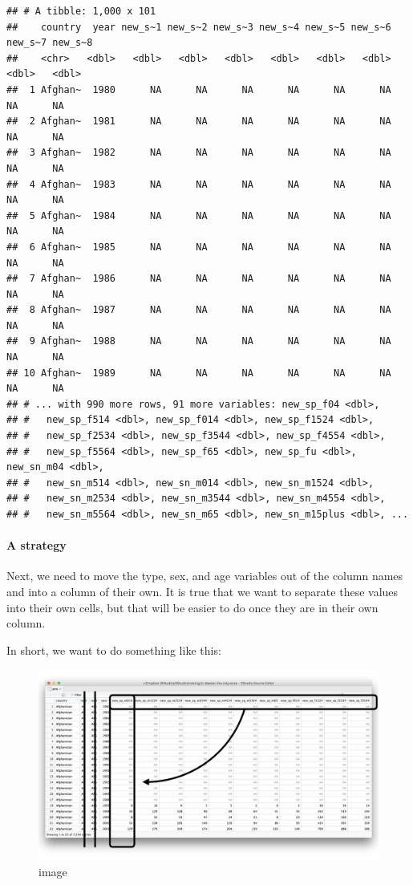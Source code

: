 \documentclass[
]{article}
\begin{document}
\begin{verbatim}
## # A tibble: 1,000 x 101
##    country  year new_s~1 new_s~2 new_s~3 new_s~4 new_s~5 new_s~6 new_s~7 new_s~8
##    <chr>   <dbl>   <dbl>   <dbl>   <dbl>   <dbl>   <dbl>   <dbl>   <dbl>   <dbl>
##  1 Afghan~  1980      NA      NA      NA      NA      NA      NA      NA      NA
##  2 Afghan~  1981      NA      NA      NA      NA      NA      NA      NA      NA
##  3 Afghan~  1982      NA      NA      NA      NA      NA      NA      NA      NA
##  4 Afghan~  1983      NA      NA      NA      NA      NA      NA      NA      NA
##  5 Afghan~  1984      NA      NA      NA      NA      NA      NA      NA      NA
##  6 Afghan~  1985      NA      NA      NA      NA      NA      NA      NA      NA
##  7 Afghan~  1986      NA      NA      NA      NA      NA      NA      NA      NA
##  8 Afghan~  1987      NA      NA      NA      NA      NA      NA      NA      NA
##  9 Afghan~  1988      NA      NA      NA      NA      NA      NA      NA      NA
## 10 Afghan~  1989      NA      NA      NA      NA      NA      NA      NA      NA
## # ... with 990 more rows, 91 more variables: new_sp_f04 <dbl>,
## #   new_sp_f514 <dbl>, new_sp_f014 <dbl>, new_sp_f1524 <dbl>,
## #   new_sp_f2534 <dbl>, new_sp_f3544 <dbl>, new_sp_f4554 <dbl>,
## #   new_sp_f5564 <dbl>, new_sp_f65 <dbl>, new_sp_fu <dbl>, new_sn_m04 <dbl>,
## #   new_sn_m514 <dbl>, new_sn_m014 <dbl>, new_sn_m1524 <dbl>,
## #   new_sn_m2534 <dbl>, new_sn_m3544 <dbl>, new_sn_m4554 <dbl>,
## #   new_sn_m5564 <dbl>, new_sn_m65 <dbl>, new_sn_m15plus <dbl>, ...
\end{verbatim}

\hypertarget{a-strategy-1}{%
\paragraph{A strategy}\label{a-strategy-1}}

Next, we need to move the type, sex, and age variables out of the column
names and into a column of their own. It is true that we want to
separate these values into their own cells, but that will be easier to
do once they are in their own column.

In short, we want to do something like this:

\begin{figure}
\centering
\includegraphics{data/reshape.png}
\caption{image}
\end{figure}
\end{document}
